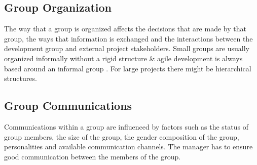 \documentclass[dvips,12pt]{article}
\begin{document}
\subsection{Group Organization}
The way that a group is organized affects the decisions that are made by that group, the ways that information is exchanged and the interactions between the development group and external project stakeholders. Small groups are usually organized informally without a rigid structure \& agile development is always based around an informal group . For large projects there might be hierarchical structures.

\subsection{Group Communications}
Communications within a group are influenced by factors such as the status of group members, the size of the group, the gender composition of the group, personalities and available communication channels. The manager has to ensure good communication between the members of the group.
\end{document}
